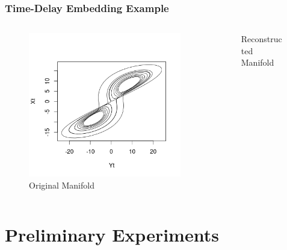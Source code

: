 \documentclass{beamer}
\begin{document}
\begin{frame}
\frametitle{Time-Delay Embedding Example}
\vspace{-9mm}
\begin{columns}[onlytextwidth]
  \begin{column}{0.5\textwidth}
\begin{figure}
\includegraphics[scale=.3]{XY} 
\caption{Original Manifold}
\end{figure} 
\end{column} 

\begin{column}{0.5\textwidth}

\begin{figure}
\caption{Reconstructed Manifold}
\end{figure}
\end{column}
\end{columns}
\end{frame}










\section{Preliminary Experiments}
\end{document}
